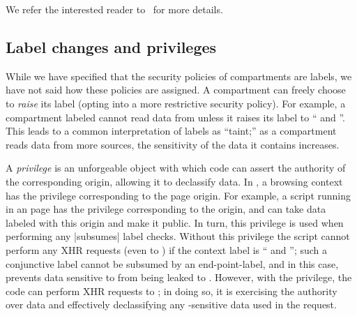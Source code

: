 %
%
%
We refer the interested reader to~\cite{stefan:2011:dclabels} for more
details.

\subsection{Label changes and privileges}

While we have specified that the security policies of compartments
are labels, we have not said how these policies are assigned.  A
compartment can freely choose to \emph{raise} its label (opting
into a more restrictive security policy).
%
For example, a compartment labeled  cannot read data
from  unless it raises its label to `` and ''.
%
This leads to a common interpretation of labels as ``taint;'' as
a compartment reads data from more sources, the sensitivity of the
data it contains increases.

%
A \emph{privilege} is an unforgeable object with which code can assert the
authority of the corresponding origin, allowing it to declassify
data.
%
In \sys, a browsing context has the privilege corresponding to the
page origin.
%
For example, a script running in an  page has the
privilege corresponding to the  origin, and
can take data labeled with this origin and make it public.
%
In turn, this privilege is used when performing any \js|subsumes|
label checks.
%
Without this privilege the script cannot perform any XHR requests
(even to ) if the context label is
`` and '';
such a conjunctive label cannot be subsumed by an end-point-label, and
in this case, prevents data sensitive to 
from being leaked to .
%
However, with the   privilege, the code can perform
XHR requests to ; in doing so, it is exercising the
authority over  data and effectively declassifying
any -sensitive data used in the request.
 
